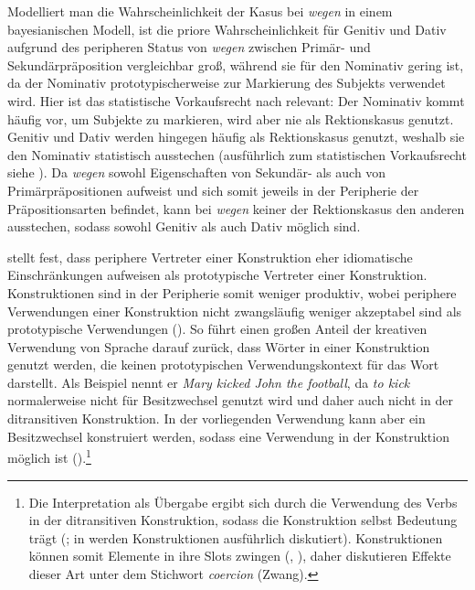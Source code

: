 Modelliert man die Wahrscheinlichkeit der Kasus bei \textit{wegen} in einem bayesianischen Modell, ist die priore Wahrscheinlichkeit für Genitiv und Dativ aufgrund des peripheren Status von \textit{wegen} zwischen Primär- und Sekundärpräposition vergleichbar groß, während sie für den Nominativ gering ist, da der Nominativ prototypischerweise zur Markierung des Subjekts verwendet wird. Hier ist das statistische Vorkaufsrecht nach \textcite[74--94]{Goldberg.2019} relevant: Der Nominativ kommt häufig vor, um Subjekte zu markieren, wird aber nie als Rektionskasus genutzt. Genitiv und Dativ werden hingegen häufig als Rektionskasus genutzt, weshalb sie den Nominativ statistisch ausstechen (ausführlich zum statistischen Vorkaufsrecht siehe ). Da \textit{wegen} sowohl Eigenschaften von Sekundär- als auch von Primärpräpositionen aufweist und sich somit jeweils in der Peripherie der Präposi\-tionsarten befindet, kann bei \textit{wegen} keiner der Rektionskasus den anderen ausstechen, sodass sowohl Genitiv als auch Dativ möglich sind.

 \textcite[198]{Taylor.1998} stellt fest, dass periphere Vertreter einer Konstruktion eher idioma\-tische Einschränkungen aufweisen als prototypische Vertreter einer Konstruktion. Konstruktionen sind in der Peripherie somit weniger produktiv, wobei periphere Verwendungen einer Konstruktion nicht zwangsläufig weniger akzeptabel sind als prototypische Verwendungen (\cite[198]{Taylor.1998}). So führt \textcite[xvii]{Tomasello.1998} einen großen Anteil der kreativen Verwendung von Sprache darauf zurück, dass Wörter in einer Konstruktion genutzt werden, die keinen prototypischen Verwendungskontext für das Wort darstellt. Als Beispiel nennt er \textit{Mary kicked John the football}, da \textit{to kick} normalerweise nicht für Besitzwechsel genutzt wird und daher auch nicht in der ditransitiven Konstruktion. In der vorliegenden Verwendung kann aber ein Besitzwechsel konstruiert werden, sodass eine Verwendung in der Konstruktion möglich ist (\cite[xvii]{Tomasello.1998}).\footnote{Die Interpretation als Übergabe ergibt sich durch die Verwendung des Verbs in der ditransitiven Konstruktion, sodass die Konstruktion selbst Bedeutung trägt (\cite[xviii]{Tomasello.1998}; in  werden Konstruktionen ausführlich diskutiert). Konstruktionen können somit Elemente in ihre Slots zwingen (\cite[198]{Taylor.1998}, \cite[37]{Goldberg.2019}), daher diskutieren \textcite{AudringBooij.2016} Effekte dieser Art unter dem Stichwort \textit{coercion} (Zwang).}

